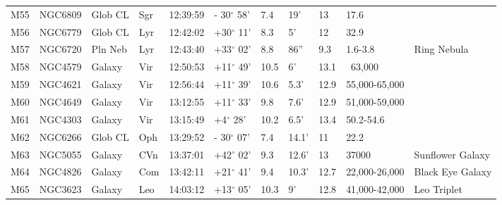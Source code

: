 \documentclass[10pt,twoside,a4paper,english]{article}
\begin{document}
\begin{longtable}{@{}lllllllllll@{}}
M55        & NGC6809     & Glob CL    & Sgr       & 12:39:59 & - 30$^{\circ}$ 58' & 7.4       & 19'                  & 13       & 17.6                &                                           \\ 
M56        & NGC6779     & Glob CL    & Lyr       & 12:42:02 & +30$^{\circ}$ 11'  & 8.3       & 5'                   & 12       & 32.9                &                                           \\ 
M57        & NGC6720     & Pln Neb    & Lyr       & 12:43:40 & +33$^{\circ}$ 02'  & 8.8       & 86''                 & 9.3      & 1.6-3.8             & Ring Nebula                               \\ 
M58        & NGC4579     & Galaxy     & Vir       & 12:50:53 & +11$^{\circ}$ 49'  & 10.5      & 6'                   & 13.1     & ~63,000             &                                           \\ 
M59        & NGC4621     & Galaxy     & Vir       & 12:56:44 & +11$^{\circ}$ 39'  & 10.6      & 5.3'                 & 12.9     & 55,000-65,000       &                                           \\ 
M60        & NGC4649     & Galaxy     & Vir       & 13:12:55 & +11$^{\circ}$ 33'  & 9.8       & 7.6'                 & 12.9     & 51,000-59,000       &                                           \\ 
M61        & NGC4303     & Galaxy     & Vir       & 13:15:49 & +4$^{\circ}$ 28'   & 10.2      & 6.5'                 & 13.4     & 50.2-54.6           &                                           \\ 
M62        & NGC6266     & Glob CL    & Oph       & 13:29:52 & - 30$^{\circ}$ 07' & 7.4       & 14.1'                & 11       & 22.2                &                                           \\ 
M63        & NGC5055     & Galaxy     & CVn       & 13:37:01 & +42$^{\circ}$ 02'  & 9.3       & 12.6'                & 13       & 37000               & Sunflower Galaxy                          \\ 
M64        & NGC4826     & Galaxy     & Com       & 13:42:11 & +21$^{\circ}$ 41'  & 9.4       & 10.3'                & 12.7     & 22,000-26,000       & Black Eye Galaxy                          \\ 
M65        & NGC3623     & Galaxy     & Leo       & 14:03:12 & +13$^{\circ}$ 05'  & 10.3      & 9'                   & 12.8     & 41,000-42,000       & Leo Triplet                               \\ 

\end{longtable}
\end{document}
